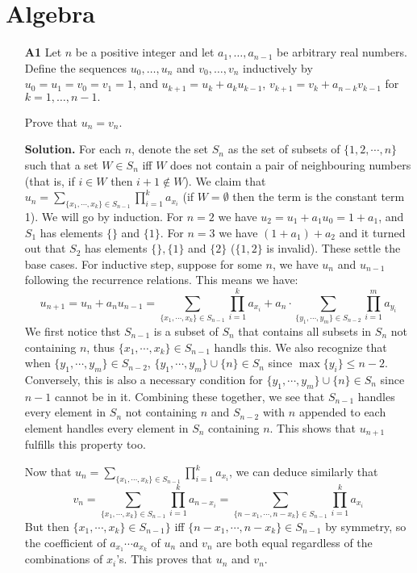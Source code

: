 \documentclass[11pt,a4paper]{article}
\begin{document}
\newcommand{\la}{\leftarrow}
\newcommand{\lra}{\leftrightarrow}
\newcommand{\bbN}{\mathbb{N}}
\newcommand{\bbZ}{\mathbb{Z}}
\newcommand{\dsum}{\displaystyle\sum}
\newcommand{\dprod}{\displaystyle\prod}

\section*{Algebra}
\begin{enumerate}
	\item[\textbf{A1}] Let $n$ be a positive integer and let $a_1, \ldots, a_{n-1} $ be arbitrary real numbers. Define the sequences $u_0, \ldots, u_n $ and $v_0, \ldots, v_n $ inductively by $u_0 = u_1  = v_0 = v_1 = 1$, and $u_{k+1} = u_k + a_k u_{k-1}$,  $v_{k+1} = v_k + a_{n-k} v_{k-1}$ for $k=1, \ldots, n-1.$
	
	Prove that $u_n = v_n.$
	
	\textbf{Solution.} For each $n$, denote the set $S_n$ as the set of subsets of $\{1, 2, \cdots , n\}$ such that a set $W\in S_n$ iff $W$ does not contain a pair of neighbouring numbers (that is, if $i\in W$ then $i+1\not\in W$). We claim that $u_n = \dsum_{\{x_1, \cdots , x_k\}\in S_{n-1}}\dprod_{i=1}^k a_{x_i}$ (if $W=\emptyset$ then the term is the constant term 1). We will go by induction. For $n=2$ we have $u_2=u_1+a_1u_0=1+a_1$, and $S_1$ has elements $\{\}$ and $\{1\}$. For $n=3$ we have $(1+a_1)+a_2$ and it turned out that $S_2$ has elements $\{\}, \{1\}$ and $\{2\}$ ($\{1, 2\}$ is invalid). 
	These settle the base cases. 
	For inductive step, suppose for some $n$, we have $u_n$ and $u_{n-1}$ following the recurrence relations. This means we have: 
	\[
	u_{n+1} = u_n + a_nu_{n-1}
	= \dsum_{\{x_1, \cdots , x_k\}\in S_{n-1}}\dprod_{i=1}^k a_{x_i}
	+ a_n\cdot \dsum_{\{y_1, \cdots , y_m\}\in S_{n-2}}\dprod_{i=1}^m a_{y_i}
	\]
	We first notice thst $S_{n-1}$ is a subset of $S_n$ that contains all subsets in $S_n$ not containing $n$, thus $\{x_1, \cdots , x_k\}\in S_{n-1}$ handls this. 
	We also recognize that when $\{y_1, \cdots , y_m\}\in S_{n-2}$, $\{y_1, \cdots , y_m\}\cup \{n\}\in S_n$ since $\max\{y_i\}\le n-2$. Conversely, this is also a necessary condition for $\{y_1, \cdots , y_m\}\cup \{n\}\in S_n$ since $n-1$ cannot be in it. 
	Combining these together, we see that $S_{n-1}$ handles every element in $S_n$ not containing $n$ and $S_{n-2}$ with $n$ appended to each element handles every element in $S_n$ containing $n$. This shows that $u_{n+1}$ fulfills this property too. 
	
	Now that $u_n = \dsum_{\{x_1, \cdots , x_k\}\in S_{n-1}}\dprod_{i=1}^k a_{x_i}$, we can deduce similarly that \[v_n = \dsum_{\{x_1, \cdots , x_k\}\in S_{n-1}}\dprod_{i=1}^k a_{n - x_i}
	= \dsum_{\{n - x_1, \cdots , n - x_k\}\in S_{n-1}}\dprod_{i=1}^k a_{x_i}
	\]
	But then $\{x_1, \cdots , x_k\}\in S_{n-1}\}$ iff $\{n - x_1, \cdots , n - x_k\}\in S_{n-1}$ by symmetry, so the coefficient of $a_{x_1}\cdots a_{x_k}$ of $u_n$ and $v_n$ are both equal regardless of the combinations of $x_i$'s. This proves that $u_n$ and $v_n$. 
	

\end{enumerate}
\end{document}
